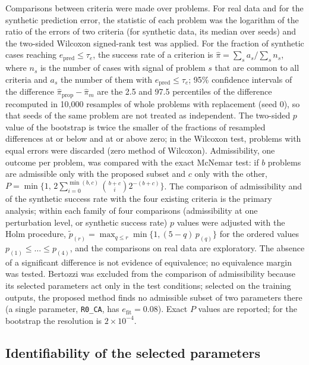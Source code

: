 \documentclass[pdflatex,sn-nature]{sn-jnl}
\theoremstyle{plain}
\begin{document}
Comparisons between criteria were made over problems. For real data and for the synthetic prediction error, the statistic of each problem was the logarithm of the ratio of the errors of two criteria (for synthetic data, its median over seeds) and the two-sided Wilcoxon signed-rank test was applied. For the fraction of synthetic cases reaching $e_{\mathrm{pred}}\le\tau_e$, the success rate of a criterion is $\hat\pi=\sum_s a_s/\sum_s n_s$, where $n_s$ is the number of cases with signal of problem $s$ that are common to all criteria and $a_s$ the number of them with $e_{\mathrm{pred}}\le\tau_e$; 95\% confidence intervals of the difference $\hat\pi_{\mathrm{prop}}-\hat\pi_m$ are the 2.5 and 97.5 percentiles of the difference recomputed in 10,000 resamples of whole problems with replacement (seed 0), so that seeds of the same problem are not treated as independent. The two-sided $p$ value of the bootstrap is twice the smaller of the fractions of resampled differences at or below and at or above zero; in the Wilcoxon test, problems with equal errors were discarded (zero method of Wilcoxon). Admissibility, one outcome per problem, was compared with the exact McNemar test: if $b$ problems are admissible only with the proposed subset and $c$ only with the other, $P=\min\{1,\,2\sum_{i=0}^{\min(b,c)}\binom{b+c}{i}2^{-(b+c)}\}$. The comparison of admissibility and of the synthetic success rate with the four existing criteria is the primary analysis; within each family of four comparisons (admissibility at one perturbation level, or synthetic success rate) $p$ values were adjusted with the Holm procedure, $\tilde p_{(r)}=\max_{q\le r}\min\{1,(5-q)\,p_{(q)}\}$ for the ordered values $p_{(1)}\le\dots\le p_{(4)}$, and the comparisons on real data are exploratory. The absence of a significant difference is not evidence of equivalence; no equivalence margin was tested. Bertozzi was excluded from the comparison of admissibility because its selected parameters act only in the test conditions; selected on the training outputs, the proposed method finds no admissible subset of two parameters there (a single parameter, \texttt{R0\_CA}, has $e_{\mathrm{fit}}=0.08$). Exact $P$ values are reported; for the bootstrap the resolution is $2\times10^{-4}$.

\subsection*{Identifiability of the selected parameters}\label{met:identif}
\end{document}

